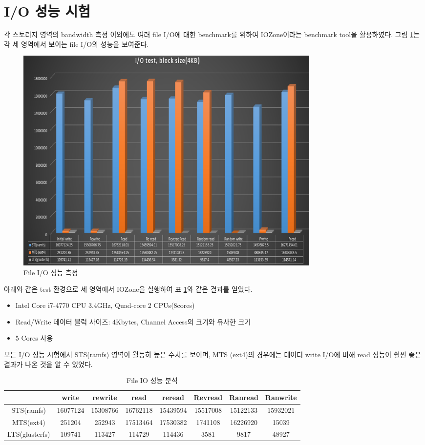 \documentclass[11pt
  , a4paper
  , article
  , oneside
]{memoir}
\begin{document}
\section{I/O 성능 시험}
각 스토리지 영역의 bandwidth 측정 이외에도 여러 file I/O에 대한 benchmark를 위하여 IOZone\cite{iozone}이라는 benchmark tool을 활용하였다. 그림 \ref{fig:file_performance}는 각 세 영역에서 보이는 file I/O의 성능을 보여준다.

\begin{figure}[h!]
	\centering
	\includegraphics[width=0.75\textwidth]{./images/image-2.eps}
	\caption{File I/O 성능 측정}
	\label{fig:file_performance} 
\end{figure}

아래와 같은 test 환경으로 세 영역에서 IOZone을 실행하여 표 \ref{table:io_performance}와 같은 결과를 얻었다.

\begin{itemize}
	\item Intel Core i7-4770 CPU 3.4GHz, Quad-core 2 CPUs(8cores)
	\item Read/Write 데이터 블럭 사이즈: 4Kbytes, Channel Access의 크기와 유사한 크기
	\item 5 Cores 사용
\end{itemize}

모든 I/O 성능 시험에서 STS(ramfs) 영역이 월등히 높은 수치를 보이며, MTS (ext4)의 경우에는 데이터 write I/O에 비해 read 성능이 훨씬 좋은 결과가 나온 것을 알 수 있었다.

\begin{table}[h!]
\begin{center}
		\begin{tabular} {c|c|c|c|c|c|c|c} \hline \hline
			\cline{2-8}
			& write & rewrite & read & reread & Revread & Ranread & Ranwrite \\ \hline\hline
			STS(ramfs)  & 16077124 & 15308766 & \tiny16762118 & 15439594 & 15517008 & 15122133 & 15932021 \\ \hline\hline
			MTS(ext4)   & 251204 & 252943 & 17513464 & 17530382 & 1741108 & 16226920 & 15039  \\ \hline\hline
			LTS(glusterfs) & 109741 & 113427 & 114729 & 114436 & 3581 & 9817 & 48927  \\ \hline\hline
		\end{tabular}
		\caption{  File IO 성능 분석 }
		\label{table:io_performance} 
\end{center}
\end {table} 
\end{document}
